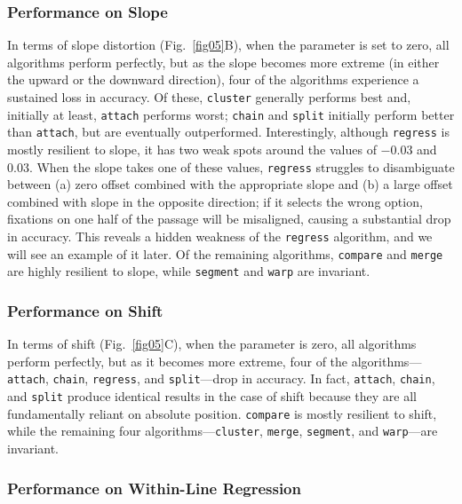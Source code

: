 \documentclass[doc,biblatex]{apa7}
\begin{document}
\subsubsection{Performance on Slope}

In terms of slope distortion (Fig.~\ref{fig05}B), when the parameter is set to zero, all algorithms perform perfectly, but as the slope becomes more extreme (in either the upward or the downward direction), four of the algorithms experience a sustained loss in accuracy. Of these, \texttt{cluster} generally performs best and, initially at least, \texttt{attach} performs worst; \texttt{chain} and \texttt{split} initially perform better than \texttt{attach}, but are eventually outperformed. Interestingly, although \texttt{regress} is mostly resilient to slope, it has two weak spots around the values of $-0.03$ and $0.03$. When the slope takes one of these values, \texttt{regress} struggles to disambiguate between (a) zero offset combined with the appropriate slope and (b) a large offset combined with slope in the opposite direction; if it selects the wrong option, fixations on one half of the passage will be misaligned, causing a substantial drop in accuracy. This reveals a hidden weakness of the \texttt{regress} algorithm, and we will see an example of it later. Of the remaining algorithms, \texttt{compare} and \texttt{merge} are highly resilient to slope, while \texttt{segment} and \texttt{warp} are invariant.

\subsubsection{Performance on Shift}

In terms of shift (Fig.~\ref{fig05}C), when the parameter is zero, all algorithms perform perfectly, but as it becomes more extreme, four of the algorithms---\texttt{attach}, \texttt{chain}, \texttt{regress}, and \texttt{split}---drop in accuracy. In fact, \texttt{attach}, \texttt{chain}, and \texttt{split} produce identical results in the case of shift because they are all fundamentally reliant on absolute position. \texttt{compare} is mostly resilient to shift, while the remaining four algorithms---\texttt{cluster}, \texttt{merge}, \texttt{segment}, and \texttt{warp}---are invariant.

\subsubsection{Performance on Within-Line Regression}
\end{document}
